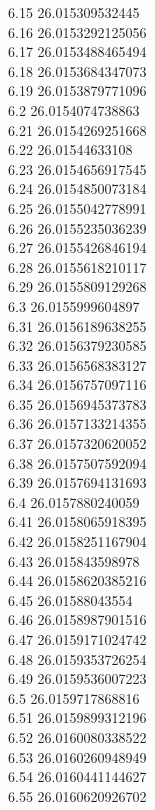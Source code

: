 {6.15	26.015309532445\\
6.16	26.0153292125056\\
6.17	26.0153488465494\\
6.18	26.0153684347073\\
6.19	26.0153879771096\\
6.2	26.0154074738863\\
6.21	26.0154269251668\\
6.22	26.01544633108\\
6.23	26.0154656917545\\
6.24	26.0154850073184\\
6.25	26.0155042778991\\
6.26	26.0155235036239\\
6.27	26.0155426846194\\
6.28	26.0155618210117\\
6.29	26.0155809129268\\
6.3	26.0155999604897\\
6.31	26.0156189638255\\
6.32	26.0156379230585\\
6.33	26.0156568383127\\
6.34	26.0156757097116\\
6.35	26.0156945373783\\
6.36	26.0157133214355\\
6.37	26.0157320620052\\
6.38	26.0157507592094\\
6.39	26.0157694131693\\
6.4	26.0157880240059\\
6.41	26.0158065918395\\
6.42	26.0158251167904\\
6.43	26.015843598978\\
6.44	26.0158620385216\\
6.45	26.01588043554\\
6.46	26.0158987901516\\
6.47	26.0159171024742\\
6.48	26.0159353726254\\
6.49	26.0159536007223\\
6.5	26.0159717868816\\
6.51	26.0159899312196\\
6.52	26.0160080338522\\
6.53	26.0160260948949\\
6.54	26.0160441144627\\
6.55	26.0160620926702\\
}
